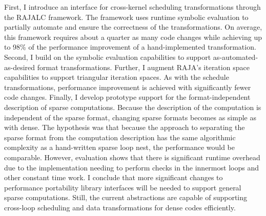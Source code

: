 First, I introduce an interface for cross-kernel scheduling transformations through the RAJALC framework.
The framework uses runtime symbolic evaluation to partially automate and ensure the correctness of the transformations.
On average, this framework requires about a quarter as many code changes while achieving up to 98\% of the performance improvement of a hand-implemented transformation.
Second, I build on the symbolic evaluation capabilities to support as-automated-as-desired format transformations.
Further, I augment RAJA's iteration space capabilities to support triangular iteration spaces.
As with the schedule transformations, performance improvement is achieved with significantly fewer code changes.
Finally, I develop prototype support for the format-independent description of sparse computations.
Because the description of the computation is independent of the sparse format, changing sparse formats becomes as simple as with dense.
The hypothesis was that because the approach to separating the sparse format from the computation description has the same algorithmic complexity as a hand-written sparse loop nest, the performance would be comparable.
However, evaluation shows that there is significant runtime overhead due to the implementation needing to perform checks in the innermost loops and other constant time work.
I conclude that more significant changes to performance portability library interfaces will be needed to support general sparse computations.
Still, the current abstractions are capable of supporting cross-loop scheduling and data transformations for dense codes efficiently. 



\pagestyle{thesis}